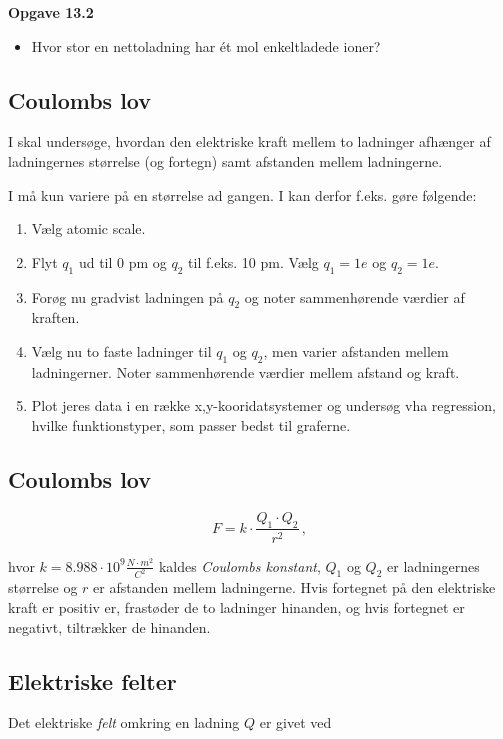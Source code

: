 \documentclass[11pt]{article}
\begin{document}
\textbf{Opgave 13.2}

\begin{itemize}
\item Hvor stor en nettoladning har ét mol enkeltladede ioner?
\end{itemize}

\subsection*{Coulombs lov}
\label{sec:org5daf78e}
I skal undersøge, hvordan den elektriske kraft mellem to ladninger afhænger af ladningernes størrelse (og fortegn) samt afstanden mellem ladningerne.

I må kun variere på en størrelse ad gangen. I kan derfor f.eks. gøre følgende:

\begin{enumerate}
\item Vælg atomic scale.
\item Flyt \(q_1\) ud til 0 pm og \(q_2\) til f.eks. 10 pm. Vælg \(q_1=1e\) og \(q_2=1e\).
\item Forøg nu gradvist ladningen på \(q_2\) og noter sammenhørende værdier af kraften.
\item Vælg nu to faste ladninger til \(q_1\) og \(q_2\), men varier afstanden mellem ladningerner. Noter sammenhørende værdier mellem afstand og kraft.
\item Plot jeres data i en række x,y-kooridatsystemer og undersøg vha regression, hvilke funktionstyper, som passer bedst til graferne.
\end{enumerate}

\subsection*{Coulombs lov}
\label{sec:org5e74341}
$$F = k \cdot \frac{Q_1\cdot Q_2}{r^2}\,,$$

hvor \(k=8.988 \cdot 10^9 \frac{N \cdot m^2}{C^2}\) kaldes \emph{Coulombs konstant}, \(Q_1\) og \(Q_2\) er ladningernes størrelse og \(r\) er afstanden mellem ladningerne. Hvis fortegnet på den elektriske kraft er positiv er, frastøder de to ladninger hinanden, og hvis fortegnet er negativt, tiltrækker de hinanden.

\subsection*{Elektriske felter}
\label{sec:orgcb6dd17}
Det elektriske \emph{felt} omkring en ladning \(Q\) er givet ved
\end{document}
